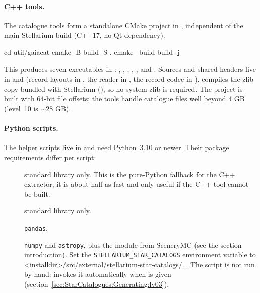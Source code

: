 \paragraph{C++ tools.} The catalogue tools form a standalone CMake project
in , independent of the main Stellarium build (C++17,
no Qt dependency):

\begin{commands}
cd util/gaiacat
cmake -B build -S .
cmake --build build -j
\end{commands}

This produces seven executables in :
, , ,
, ,  and
. Sources and shared headers live in
 and  (record layouts
in , the  reader in , the
record codec in ).
 compiles the zlib copy bundled with Stellarium
(), so no system zlib
is required. The project is built with 64-bit file offsets; the tools
handle catalogue files well beyond 4 GB (level~10 is $\sim$28 GB).

\paragraph{Python scripts.} The helper scripts live in
 and need Python~3.10 or newer. Their package
requirements differ per script:

\begin{description}
  \item[] standard library only. This is the
        pure-Python fallback for the C++ extractor; it is about half as
        fast and only useful if the C++ tool cannot be built.
  \item[] standard library only.
  \item[] \texttt{pandas}.
  \item[] \texttt{numpy} and \texttt{astropy}, plus
        the  module from SceneryMC (see the
        section introduction). Set the
        \texttt{STELLARIUM\_\allowbreak STAR\_\allowbreak CATALOGS}
        environment variable to <installdir>/src/external/stellarium-star-catalogs/... The script is not run by hand: 
        invokes it automatically when  is given
        (section~\ref{sec:StarCatalogues:Generating:lv03}).
\end{description}

